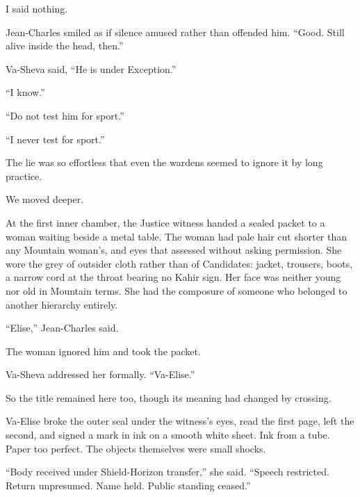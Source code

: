 I said nothing.\par

Jean-Charles smiled as if silence amused rather than offended him. ``Good. Still alive inside the head, then.''\par

Va-Sheva said, ``He is under Exception.''\par

``I know.''\par

``Do not test him for sport.''\par

``I never test for sport.''\par

The lie was so effortless that even the wardens seemed to ignore it by long practice.\par

We moved deeper.\par

At the first inner chamber, the Justice witness handed a sealed packet to a woman waiting beside a metal table. The woman had pale hair cut shorter than any Mountain woman's, and eyes that assessed without asking permission. She wore the grey of outsider cloth rather than of Candidates: jacket, trousers, boots, a narrow cord at the throat bearing no Kahir sign. Her face was neither young nor old in Mountain terms. She had the composure of someone who belonged to another hierarchy entirely.\par

``Elise,'' Jean-Charles said.\par

The woman ignored him and took the packet.\par

Va-Sheva addressed her formally. ``Va-Elise.''\par

So the title remained here too, though its meaning had changed by crossing.\par

Va-Elise broke the outer seal under the witness's eyes, read the first page, left the second, and signed a mark in ink on a smooth white sheet. Ink from a tube. Paper too perfect. The objects themselves were small shocks.\par

``Body received under Shield-Horizon transfer,'' she said. ``Speech restricted. Return unpresumed. Name held. Public standing ceased.''\par

